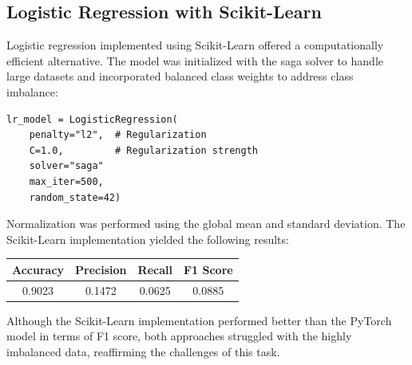 \documentclass[conference,9pt]{IEEEtran}
\begin{document}
\subsection{Logistic Regression with Scikit-Learn}
Logistic regression implemented using Scikit-Learn offered a computationally efficient alternative. The model was initialized with the saga solver to handle large datasets and incorporated balanced class weights to address class imbalance:
\begin{lstlisting}
lr_model = LogisticRegression(
    penalty="l2",  # Regularization
    C=1.0,         # Regularization strength
    solver="saga"
    max_iter=500,
    random_state=42)
\end{lstlisting}
Normalization was performed using the global mean and standard deviation. The Scikit-Learn implementation yielded the following results:
\begin{center}
    \begin{tabular}{c|c|c|c}
        Accuracy & Precision & Recall & F1 Score \\ 
        \hline 
        0.9023 & 0.1472 &  0.0625 & 0.0885\\
    \end{tabular}
\end{center}
Although the Scikit-Learn implementation performed better than the PyTorch model in terms of F1 score, both approaches struggled with the highly imbalanced data, reaffirming the challenges of this task.
\end{document}
